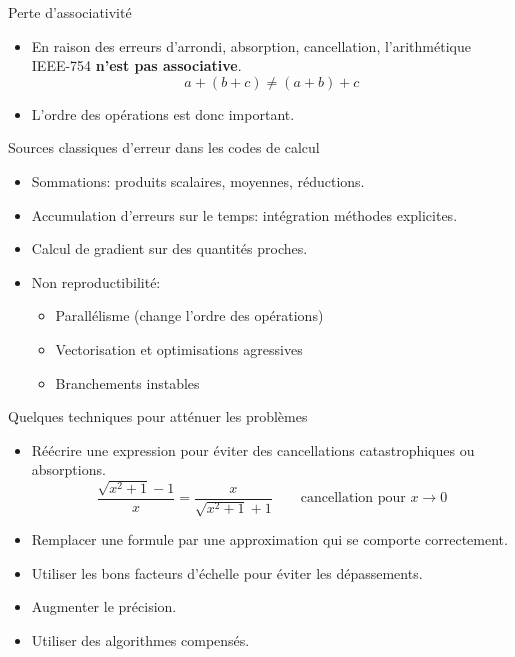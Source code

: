\documentclass{beamer}
\begin{document}
\begin{frame}{Perte d'associativité}
    \begin{itemize}
        \item En raison des erreurs d'arrondi, absorption, cancellation, l'arithmétique IEEE-754 \textbf{n'est pas associative}.
              \[ a + (b + c) \ne (a + b) +c \]
        \item L'ordre des opérations est donc important.
    \end{itemize}
\end{frame}

\begin{frame}{Sources classiques d'erreur dans les codes de calcul}
    \begin{itemize}
        \item Sommations: produits scalaires, moyennes, réductions.
        \item Accumulation d'erreurs sur le temps: intégration méthodes explicites.
        \item Calcul de gradient sur des quantités proches.
        \item Non reproductibilité:
              \begin{itemize}
                  \item Parallélisme (change l'ordre des opérations)
                  \item Vectorisation et optimisations agressives
                  \item Branchements instables
              \end{itemize}
    \end{itemize}
\end{frame}
\begin{frame}{Quelques techniques pour atténuer les problèmes}
    \begin{itemize}
        \item Réécrire une expression pour éviter des cancellations catastrophiques ou absorptions.
              \[ \frac{\sqrt{x^2+1}-1}{x} = \frac{x}{\sqrt{x^2+1}+1} \qquad \text {cancellation pour } x \rightarrow 0 \]
        \item Remplacer une formule par une approximation qui se comporte correctement.
        \item Utiliser les bons facteurs d'échelle pour éviter les dépassements.
        \item Augmenter le précision.
        \item Utiliser des algorithmes compensés.
    \end{itemize}
\end{frame}
\end{document}
